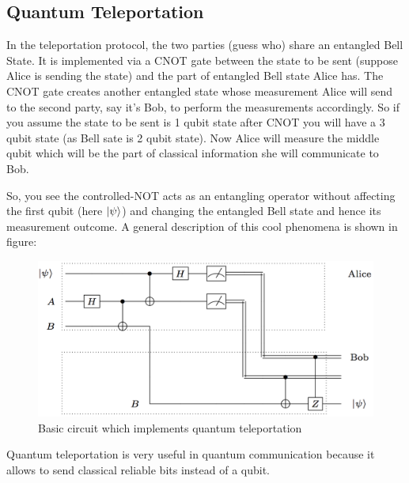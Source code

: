\subsection*{Quantum Teleportation}
In the teleportation protocol, the two parties (guess who)  share an entangled Bell State.  It is implemented via a CNOT gate between the state to be sent (suppose Alice is sending the state) and the part of entangled Bell state Alice has. The CNOT gate creates another entangled state whose measurement Alice will send to the second party, say it's Bob, to perform the measurements accordingly. So if you assume the state to be sent is 1 qubit state after CNOT you will have a 3 qubit state (as Bell sate is 2 qubit state). Now Alice will measure the middle qubit which will be the part of classical information she will communicate to Bob.

So, you see the controlled-NOT acts as an entangling operator without affecting the first qubit (here $\ket{\psi}$) and changing the entangled Bell state and hence its measurement outcome.
A general description of this cool phenomena is shown in figure: 
\begin{figure}[h!]
    \centering
    \includegraphics[width=\textwidth]{Mainmatter/images/teleportation-circuit.png}
    \caption{Basic circuit which implements quantum teleportation}
    \label{fig:teleportation}
\end{figure}
Quantum teleportation is very useful in quantum communication because it allows to send classical reliable bits instead of a qubit.